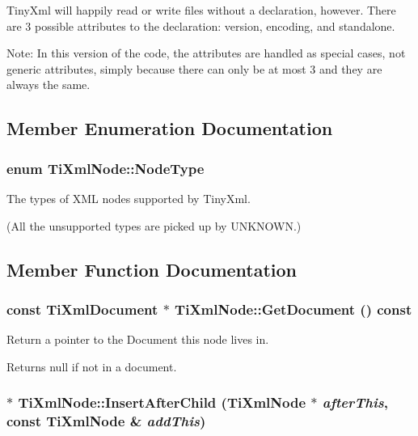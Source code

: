 Tiny\-Xml will happily read or write files without a declaration, however. There are 3 possible attributes to the declaration: version, encoding, and standalone.

Note: In this version of the code, the attributes are handled as special cases, not generic attributes, simply because there can only be at most 3 and they are always the same. 



\subsection{Member Enumeration Documentation}
\subsubsection{\setlength{\rightskip}{0pt plus 5cm}enum {\bf Ti\-Xml\-Node::Node\-Type}\hspace{0.3cm}{\tt  [inherited]}}\label{classTiXmlNode_TiXmlUnknownw7}


The types of XML nodes supported by Tiny\-Xml. 

(All the unsupported types are picked up by UNKNOWN.)

\subsection{Member Function Documentation}
\subsubsection{\setlength{\rightskip}{0pt plus 5cm}const {\bf Ti\-Xml\-Document} $\ast$ Ti\-Xml\-Node::Get\-Document () const\hspace{0.3cm}{\tt  [inherited]}}\label{classTiXmlNode_TiXmlUnknowna63}


Return a pointer to the Document this node lives in. 

Returns null if not in a document.
\subsubsection{ $\ast$ Ti\-Xml\-Node::Insert\-After\-Child ({\bf Ti\-Xml\-Node} $\ast$ {\em after\-This}, const {\bf Ti\-Xml\-Node} \& {\em add\-This})\hspace{0.3cm}{\tt  [inherited]}}\label{classTiXmlNode_TiXmlUnknowna35}


